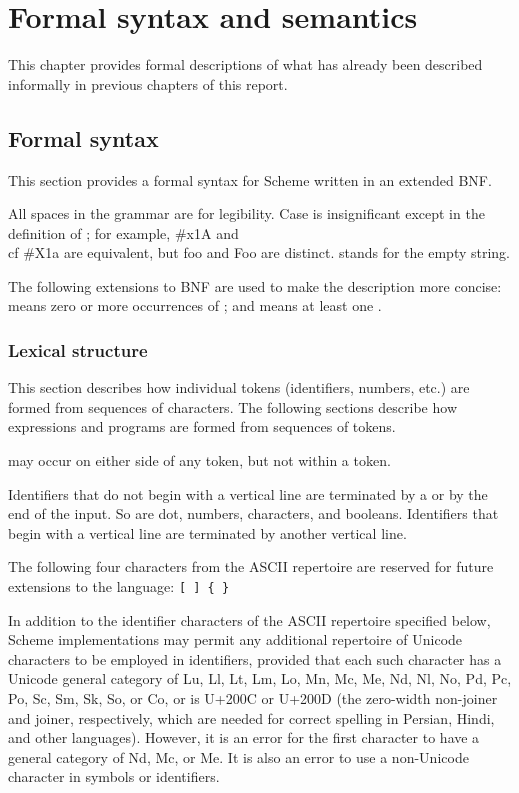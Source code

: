 \chapter{Formal syntax and semantics}
\label{formalchapter}

This chapter provides formal descriptions of what has already been
described informally in previous chapters of this report.



\section{Formal syntax}
\label{BNF}

This section provides a formal syntax for Scheme written in an extended
BNF.

All spaces in the grammar are for legibility.  Case is insignificant
except in the definition of ; for example, {\cf \#x1A}
and {\\cf \#X1a} are equivalent, but {\cf foo} and {\cf Foo} are distinct.
 stands for the empty string.

The following extensions to BNF are used to make the description more
concise:   means zero or more occurrences of
; and  means at least one
.


\subsection{Lexical structure}

This section describes how individual tokens (identifiers,
numbers, etc.) are formed from sequences of characters.  The following
sections describe how expressions and programs are formed from sequences
of tokens.

 may occur on either side of any token, but not
within a token.

\vest Identifiers that do not begin with a vertical line are
terminated by a  or by the end of the input.
So are dot, numbers, characters, and booleans.
Identifiers that begin with a vertical line are terminated by another vertical line.

The following four characters from the ASCII repertoire
are reserved for future extensions to the
language: {\tt \verb"[" \verb"]" \verb"{" \verb"}"}

In addition to the identifier characters of the ASCII repertoire specified
below, Scheme implementations may permit any additional repertoire of
Unicode characters to be employed in identifiers,
provided that each such character has a Unicode general category of Lu,
Ll, Lt, Lm, Lo, Mn, Mc, Me, Nd, Nl, No, Pd, Pc, Po, Sc, Sm, Sk, So,
or Co, or is U+200C or U+200D (the zero-width non-joiner and joiner,
respectively, which are needed for correct spelling in Persian, Hindi,
and other languages).
However, it is an error for the first character to have a general category
of Nd, Mc, or Me.  It is also an error to use a non-Unicode character
in symbols or identifiers.

